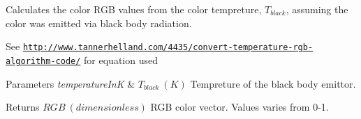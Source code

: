 Calculates the color R\+GB values from the color tempreture, $T_{black}$, assuming the color was emitted via black body radiation. 

See \href{http://www.tannerhelland.com/4435/convert-temperature-rgb-algorithm-code/}{\tt http\+://www.\+tannerhelland.\+com/4435/convert-\/temperature-\/rgb-\/algorithm-\/code/} for equation used


\begin{DoxyParams}{Parameters}
{\em temperature\+InK} & $T_{black}\ (K)$ Tempreture of the black body emittor. \\
\hline
\end{DoxyParams}
\begin{DoxyReturn}{Returns}
$RGB\ (dimensionless)$ R\+GB color vector. Values varies from 0-\/1. 
\end{DoxyReturn}
